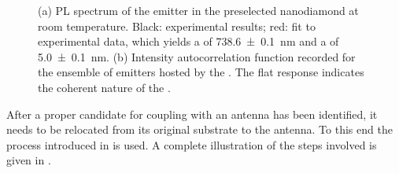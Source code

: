 \begin{figure}[!htb]
\begin{subfigure}{ 0.49\linewidth}
						\caption{}
						\label{subfig::coherent_g2}
					\end{subfigure}
					\caption[Properties of a \nd containing an ensemble of \sivs]{(a) PL spectrum of the emitter in the preselected nanodiamond at room temperature. Black: experimental results; red: fit to experimental data, which yields a \ZPL \cwl of \SI[separate-uncertainty = true]{738.6\pm0.1}{nm} and a \lw of \SI[separate-uncertainty = true]{5.0\pm0.1}{nm}. (b) Intensity autocorrelation function recorded for the ensemble of emitters hosted by the \nd. The flat response indicates the coherent nature of the \fl.}
				\end{figure}

			After a proper candidate for coupling with an antenna has been identified, it needs to be relocated from its original substrate to the antenna. To this end the \pp process introduced in  is used. A complete illustration of the steps involved is given in .

